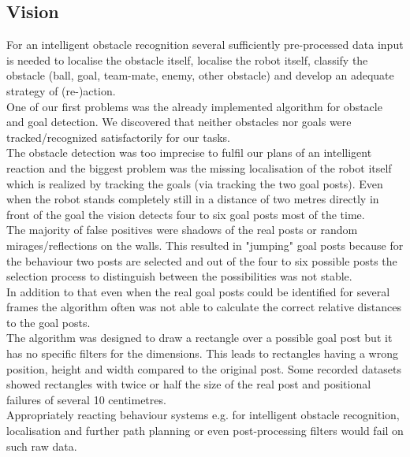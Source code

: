 \documentclass[lnicst,a4paper]{svmultln}
\begin{document}
\subsection{Vision}
\label{sec:problems_vision}
For an intelligent obstacle recognition several sufficiently pre-processed data input is needed to localise the obstacle itself, localise the robot itself, classify the obstacle (ball, goal, team-mate, enemy, other obstacle) and develop an adequate strategy of (re-)action.
\\
One of our first problems was the already implemented algorithm for obstacle and goal detection. We discovered that neither obstacles nor goals were tracked/recognized satisfactorily for our tasks.
\\
The obstacle detection was too imprecise to fulfil our plans of an intelligent reaction and the biggest problem was the missing localisation of the robot itself which is realized by tracking the goals (via tracking the two goal posts). Even when the robot stands completely still in a distance of two metres directly in front of the goal the vision detects four to six goal posts most of the time.
\\
The majority of false positives were shadows of the real posts or random mirages/reflections on the walls. This resulted in "jumping" goal posts because for the behaviour two posts are selected and out of the four to six possible posts the selection process to distinguish between the possibilities was not stable.
\\
In addition to that even when the real goal posts could be identified for several frames the algorithm often was not able to calculate the correct relative distances to the goal posts.
\\
The algorithm was designed to draw a rectangle over a possible goal post but it has no specific filters for the dimensions. This leads to rectangles having a wrong position, height and width compared to the original post. Some recorded datasets showed rectangles with twice or half the size of the real post and positional failures of several 10 centimetres.
\\
Appropriately reacting behaviour systems e.g. for intelligent obstacle recognition, localisation and further path planning or even post-processing filters would fail on such raw data.
\end{document}
